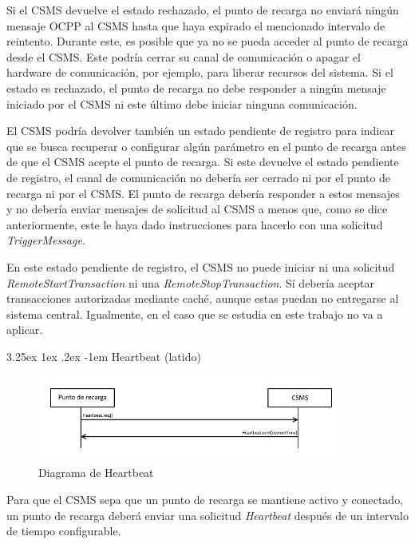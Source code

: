 \documentclass[12pt,a4paper,onecolumn,oneside]{report}
\makeatletter
\renewcommand\paragraph{\@startsection{paragraph}{5}{\z@}%
  {3.25ex \@plus1ex \@minus.2ex}%
  {-1em}%
  {\normalfont\normalsize\bfseries}}
\makeatother
\begin{document}
Si el CSMS devuelve el estado rechazado, el punto de recarga no enviará ningún mensaje OCPP al CSMS hasta que haya expirado el mencionado intervalo de reintento. Durante este, es posible que ya no se pueda acceder al punto de recarga desde el CSMS. Este podría cerrar su canal de comunicación o apagar el hardware de comunicación, por ejemplo, para liberar recursos del sistema. Si el estado es rechazado, el punto de recarga no debe responder a ningún mensaje iniciado por el CSMS ni este último debe iniciar ninguna comunicación.

El CSMS podría devolver también un estado pendiente de registro para indicar que se busca recuperar o configurar algún parámetro en el punto de recarga antes de que el CSMS acepte el punto de recarga. Si este devuelve el estado pendiente de registro, el canal de comunicación no debería ser cerrado ni por el punto de recarga ni por el CSMS. El punto de recarga debería responder a estos mensajes y no debería enviar mensajes de solicitud al CSMS a menos que, como se dice anteriormente, este le haya dado instrucciones para hacerlo con una solicitud \textit{TriggerMessage}.

En este estado pendiente de registro, el CSMS no puede iniciar ni una solicitud \textit{RemoteStartTransaction} ni una \textit{RemoteStopTransaction}. Sí debería aceptar transacciones autorizadas mediante caché, aunque estas puedan no entregarse al sistema central. Igualmente, en el caso que se estudia en este trabajo no va a aplicar.

\paragraph{Heartbeat (latido)}
\label{Heartbeat (latido)}


\begin{figure}[H] 
\centering
  \includegraphics[width=0.9\textwidth]{figuras/diagramaheartbeat.png}
  \caption[Diagrama de \textit{Heartbeat}]{Diagrama de Heartbeat\\
  }
  \label{fig:diagramaheartbeat}
\end{figure}


Para que el CSMS sepa que un punto de recarga se mantiene activo y conectado, un punto de recarga deberá enviar una solicitud \textit{Heartbeat} después de un intervalo de tiempo configurable.
\end{document}
